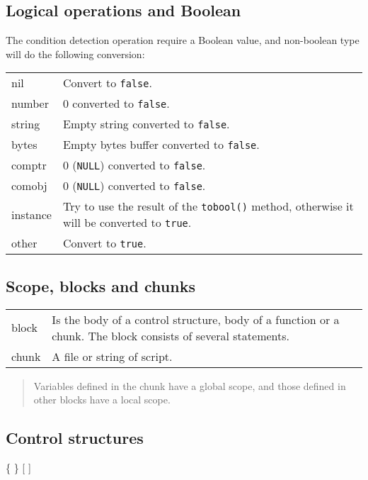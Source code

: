 \subsection*{Logical operations and Boolean}
The condition detection operation require a Boolean value, and non-boolean type will do the following conversion:\\
\begin{tabular}{lp{}}
    \textsf{nil} & Convert to \texttt{false}. \\
    \textsf{number} & 0 converted to \texttt{false}. \\
    \textsf{string} & Empty string converted to \texttt{false}. \\
    \textsf{bytes} & Empty bytes buffer converted to \texttt{false}. \\
    \textsf{comptr} & 0 (\texttt{NULL}) converted to \texttt{false}. \\
    \textsf{comobj} & 0 (\texttt{NULL}) converted to \texttt{false}. \\
    \textsf{instance} & Try to use the result of the \texttt{tobool()} method, otherwise it will be converted to \texttt{true}. \\
    \textsf{other} & Convert to \texttt{true}. \\
\end{tabular}


\subsection*{Scope, blocks and chunks}
\begin{tabular}{@{}lp{}}
    \textsf{block} & Is the body of a control structure, body of a function or a chunk. The block consists of several statements. \\
    \textsf{chunk} & A file or string of script. \\
\end{tabular}

\begin{quote}
    Variables defined in the chunk have a global scope, and those defined in other blocks have a local scope.
\end{quote}

\subsection*{Control structures}

\hangpar {}   \{  \} [ ] 

